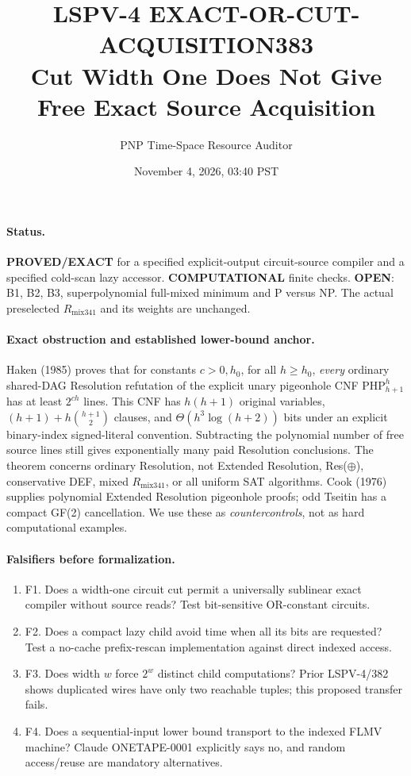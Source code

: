 \documentclass[11pt]{article}
\title{LSPV-4 EXACT-OR-CUT-ACQUISITION383\\Cut Width One Does Not Give Free Exact Source Acquisition}
\author{PNP Time-Space Resource Auditor}
\date{November 4, 2026, 03:40 PST}
\begin{document}
\maketitle
\paragraph{Status.}
\textbf{PROVED/EXACT} for a specified explicit-output circuit-source compiler and a specified cold-scan lazy accessor.
\textbf{COMPUTATIONAL} finite checks.
\textbf{OPEN}: B1, B2, B3, superpolynomial full-mixed minimum and P versus NP.
The actual preselected $R_{\mathrm{mix341}}$ and its weights are unchanged.

\paragraph{Exact obstruction and established lower-bound anchor.}
Haken (1985) proves that for constants $c>0,h_0$, for all $h\ge h_0$, \emph{every} ordinary shared-DAG Resolution refutation of the explicit unary pigeonhole CNF $\mathrm{PHP}_{h+1}^{h}$ has at least $2^{ch}$ lines.
This CNF has $h(h+1)$ original variables, $(h+1)+h\binom{h+1}{2}$ clauses, and $\Theta(h^3\log(h+2))$ bits under an explicit binary-index signed-literal convention.
Subtracting the polynomial number of free source lines still gives exponentially many paid Resolution conclusions.
The theorem concerns ordinary Resolution, not Extended Resolution, Res($\oplus$), conservative DEF, mixed $R_{\mathrm{mix341}}$, or all uniform SAT algorithms.
Cook (1976) supplies polynomial Extended Resolution pigeonhole proofs; odd Tseitin has a compact GF(2) cancellation.
We use these as \emph{countercontrols}, not as hard computational examples.

\paragraph{Falsifiers before formalization.}
\begin{enumerate}
\item[] F1. Does a width-one circuit cut permit a universally sublinear exact compiler without source reads? Test bit-sensitive OR-constant circuits.
\item[] F2. Does a compact lazy child avoid time when all its bits are requested? Test a no-cache prefix-rescan implementation against direct indexed access.
\item[] F3. Does width $w$ force $2^w$ distinct child computations? Prior LSPV-4/382 shows duplicated wires have only two reachable tuples; this proposed transfer fails.
\item[] F4. Does a sequential-input lower bound transport to the indexed FLMV machine? Claude ONETAPE-0001 explicitly says no, and random access/reuse are mandatory alternatives.
\end{enumerate}
\end{document}
